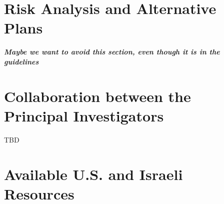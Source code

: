 \documentclass[12pt]{article}
\newcommand{\note}[1]{\textbf{\textit{#1}}}
\begin{document}
\section{Risk Analysis and Alternative Plans}
\note{Maybe we want to avoid this section, even though it is in the guidelines}

\section{Collaboration between the Principal Investigators}
TBD

\section{Available U.S. and Israeli Resources}






\pagebreak


\end{document}
